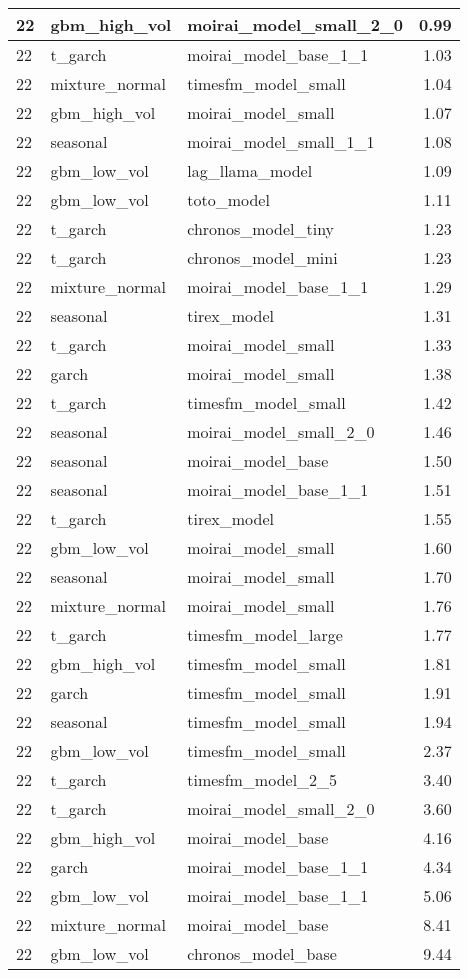 {\begin{tabular}{lllr}
\midrule
22 & gbm\_high\_vol & moirai\_model\_small\_2\_0 & 0.99 \\
\midrule
22 & t\_garch & moirai\_model\_base\_1\_1 & 1.03 \\
\midrule
22 & mixture\_normal & timesfm\_model\_small & 1.04 \\
\midrule
22 & gbm\_high\_vol & moirai\_model\_small & 1.07 \\
\midrule
22 & seasonal & moirai\_model\_small\_1\_1 & 1.08 \\
\midrule
22 & gbm\_low\_vol & lag\_llama\_model & 1.09 \\
\midrule
22 & gbm\_low\_vol & toto\_model & 1.11 \\
\midrule
22 & t\_garch & chronos\_model\_tiny & 1.23 \\
\midrule
22 & t\_garch & chronos\_model\_mini & 1.23 \\
\midrule
22 & mixture\_normal & moirai\_model\_base\_1\_1 & 1.29 \\
\midrule
22 & seasonal & tirex\_model & 1.31 \\
\midrule
22 & t\_garch & moirai\_model\_small & 1.33 \\
\midrule
22 & garch & moirai\_model\_small & 1.38 \\
\midrule
22 & t\_garch & timesfm\_model\_small & 1.42 \\
\midrule
22 & seasonal & moirai\_model\_small\_2\_0 & 1.46 \\
\midrule
22 & seasonal & moirai\_model\_base & 1.50 \\
\midrule
22 & seasonal & moirai\_model\_base\_1\_1 & 1.51 \\
\midrule
22 & t\_garch & tirex\_model & 1.55 \\
\midrule
22 & gbm\_low\_vol & moirai\_model\_small & 1.60 \\
\midrule
22 & seasonal & moirai\_model\_small & 1.70 \\
\midrule
22 & mixture\_normal & moirai\_model\_small & 1.76 \\
\midrule
22 & t\_garch & timesfm\_model\_large & 1.77 \\
\midrule
22 & gbm\_high\_vol & timesfm\_model\_small & 1.81 \\
\midrule
22 & garch & timesfm\_model\_small & 1.91 \\
\midrule
22 & seasonal & timesfm\_model\_small & 1.94 \\
\midrule
22 & gbm\_low\_vol & timesfm\_model\_small & 2.37 \\
\midrule
22 & t\_garch & timesfm\_model\_2\_5 & 3.40 \\
\midrule
22 & t\_garch & moirai\_model\_small\_2\_0 & 3.60 \\
\midrule
22 & gbm\_high\_vol & moirai\_model\_base & 4.16 \\
\midrule
22 & garch & moirai\_model\_base\_1\_1 & 4.34 \\
\midrule
22 & gbm\_low\_vol & moirai\_model\_base\_1\_1 & 5.06 \\
\midrule
22 & mixture\_normal & moirai\_model\_base & 8.41 \\
\midrule
22 & gbm\_low\_vol & chronos\_model\_base & 9.44 \\
\bottomrule
\end{tabular}
}